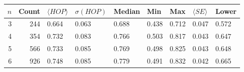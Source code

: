 \begin{tabular}{rrlllllll}
\toprule
$n$ & Count & $\langle HOP \rangle$ & $\sigma(HOP)$ & Median & Min & Max & $\langle SE \rangle$ & Lower \\
\midrule
3 & 244 & 0.664 & 0.063 & 0.688 & 0.438 & 0.712 & 0.047 & 0.572 \\
4 & 354 & 0.732 & 0.083 & 0.766 & 0.503 & 0.817 & 0.043 & 0.647 \\
5 & 566 & 0.733 & 0.085 & 0.769 & 0.498 & 0.825 & 0.043 & 0.648 \\
6 & 926 & 0.748 & 0.085 & 0.779 & 0.491 & 0.832 & 0.042 & 0.665 \\
\bottomrule
\end{tabular}
